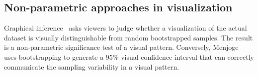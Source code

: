 \subsection{Non-parametric approaches in visualization}

Graphical inference~\cite{Buja2009, Wickham2013, Majumder2013} asks viewers to judge whether a visualization of the actual dataset is visually distinguishable from random bootstrapped samples. The result is a non-parametric significance test of a visual pattern. Conversely, Menjoge~\cite{Menjoge2010} uses bootstrapping to generate a 95\% visual confidence interval that can correctly communicate the sampling variability in a visual pattern. 

